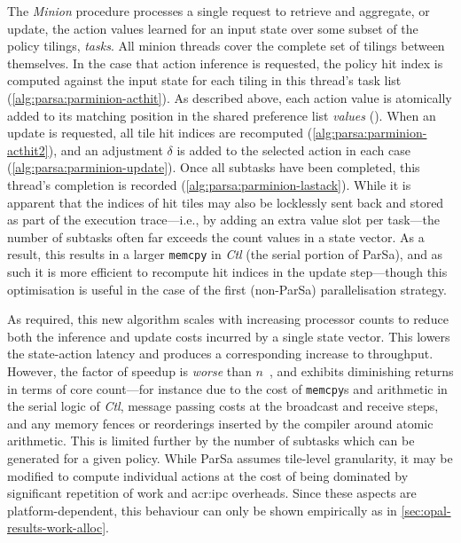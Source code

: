 The \emph{Minion} procedure processes a single request to retrieve and aggregate, or update, the action values learned for an input state over some subset of the policy tilings, \emph{tasks}.
All minion threads cover the complete set of tilings between themselves.
In the case that action inference is requested, the policy hit index is computed against the input state for each tiling in this thread's task list (\cref{alg:parsa:parminion-acthit}).
As described above, each action value is atomically added to its matching position in the shared preference list \emph{values} ().
When an update is requested, all tile hit indices are recomputed (\cref{alg:parsa:parminion-acthit2}), and an adjustment $\delta$ is added to the selected action in each case (\cref{alg:parsa:parminion-update}).
Once all subtasks have been completed, this thread's completion is recorded (\cref{alg:parsa:parminion-lastack}).
While it is apparent that the indices of hit tiles may also be locklessly sent back and stored as part of the execution trace---i.e., by adding an extra value slot per task---the number of subtasks often far exceeds the count values in a state vector.
As a result, this results in a larger \texttt{memcpy} in \emph{Ctl} (the serial portion of ParSa), and as such it is more efficient to recompute hit indices in the update step---though this optimisation is useful in the case of the first (non-ParSa) parallelisation strategy.

As required, this new algorithm scales with increasing processor counts to reduce both the inference and update costs incurred by a single state vector.
This lowers the state-action latency and produces a corresponding increase to throughput.
However, the factor of speedup is \emph{worse} than $n$~\unit{\times}, and exhibits diminishing returns in terms of core count---for instance due to the cost of \texttt{memcpy}s and arithmetic in the serial logic of \emph{Ctl}, message passing costs at the broadcast and receive steps, and any memory fences or reorderings inserted by the compiler around atomic arithmetic.
This is limited further by the number of subtasks which can be generated for a given policy.
While ParSa assumes tile-level granularity, it may be modified to compute individual actions at the cost of being dominated by significant repetition of work and \gls{acr:ipc} overheads.
Since these aspects are platform-dependent, this behaviour can only be shown empirically as in \cref{sec:opal-results-work-alloc}.